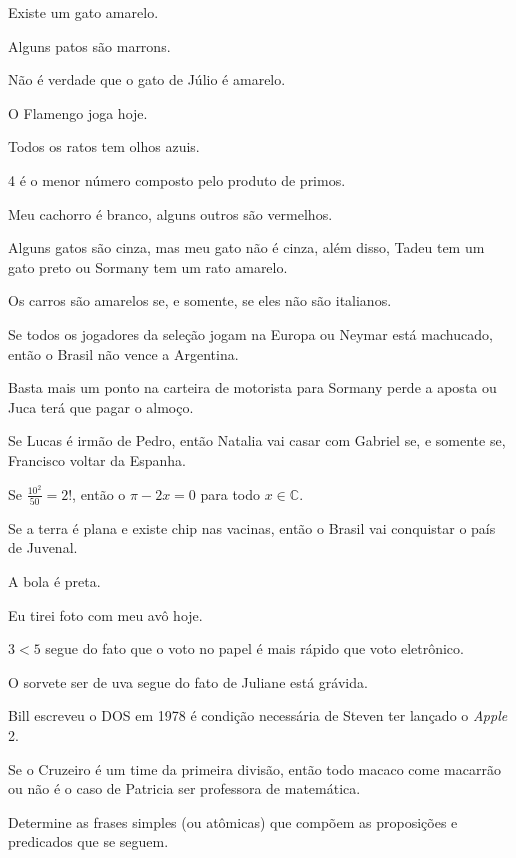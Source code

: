 \begin{exerList}
	\item Existe um gato amarelo.
	\item Alguns patos são marrons.
	\item Não é verdade que o gato de Júlio é amarelo.
	\item O Flamengo joga hoje.
	\item Todos os ratos tem olhos azuis.
	\item 4 é o menor número composto pelo produto de primos.
	\item Meu cachorro é branco, alguns outros são vermelhos.
	\item Alguns gatos são cinza, mas meu gato não é cinza, além disso, Tadeu tem um gato preto ou Sormany tem um rato amarelo.
	\item Os carros são amarelos se, e somente, se eles não são italianos.
	\item Se todos os jogadores da seleção jogam na Europa ou Neymar está machucado, então o Brasil não vence a Argentina.
	\item Basta mais um ponto na carteira de motorista para Sormany perde a aposta ou Juca terá que pagar o almoço.
	\item Se Lucas é irmão de Pedro, então Natalia vai casar com Gabriel se, e somente se, Francisco voltar da Espanha.
	\item Se $\frac{10^2}{50} = 2!$, então o $\pi - 2x = 0$ para todo $x \in \mathbb{C}$.
	\item Se a terra é plana e existe chip nas vacinas, então o Brasil vai conquistar o país de Juvenal. 
	\item A bola é preta.
	\item Eu tirei foto com meu avô hoje.
	\item $3 < 5$ segue do fato que o  voto no papel é mais rápido que voto eletrônico.
	\item O sorvete ser de uva segue do fato de Juliane está grávida.
	\item Bill escreveu o DOS em 1978 é condição necessária de Steven ter lançado o \textit{Apple} 2.
	\item Se o Cruzeiro é um time da primeira divisão, então todo macaco come macarrão ou não é o caso de Patricia ser professora de matemática. 
\end{exerList}

\begin{problem}
	Determine as frases simples (ou atômicas) que compõem as proposições e predicados que se seguem.
\end{problem}

